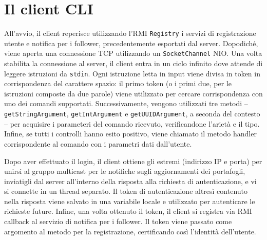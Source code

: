 \documentclass[a4paper,8pt]{article} %
\def\code#1{\texttt{#1}}
\begin{document}
\section{Il client CLI}
All'avvio, il client reperisce utilizzando l'RMI \code{Registry} i servizi di registrazione utente e notifica per i follower, precedentemente esportati dal server.
Dopodiché, viene aperta una connessione TCP utilizzando un \code{SocketChannel} NIO. Una volta stabilita la connessione al server, il client entra in un ciclo infinito
dove attende di leggere istruzioni da \code{stdin}. Ogni istruzione letta in input viene divisa in token in corrispondenza del carattere spazio: il primo token (o i primi due,
per le istruzioni composte da due parole) viene utilizzato per cercare corrispondenza con uno dei comandi supportati. Successivamente, vengono utilizzati tre metodi -- \code{getStringArgument},
\code{getIntArgument} e \code{getUUIDArgument}, a seconda del contesto -- per acquisire i parameteri del comando ricevuto, verificandone l'arietà e il tipo. Infine, se tutti i controlli hanno
esito positivo, viene chiamato il metodo handler corrispondente al comando con i parametri dati dall'utente.
\par Dopo aver effettuato il login, il client ottiene gli estremi (indirizzo IP e porta) per unirsi al gruppo multicast per le notifiche sugli aggiornamenti dei portafogli, inviatigli dal server
all'interno della risposta alla richiesta di autenticazione, e vi si connette in un thread separato. Il token di autenticazione altresì contenuto nella risposta viene salvato in una variabile locale e utilizzato per autenticare le richieste future.
Infine, una volta ottenuto il token, il client si registra via RMI callback al servizio di notifica per i follower. Il token viene passato come argomento al metodo per la registrazione, certificando così l'identità dell'utente.
\end{document}
